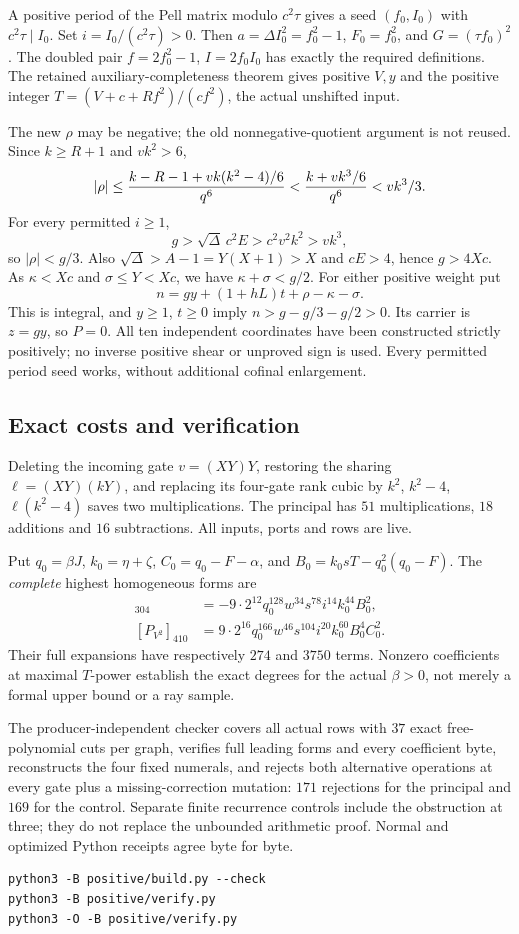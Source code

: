 A positive period of the Pell matrix modulo \(c^2\tau\) gives a seed
\((f_0,I_0)\) with \(c^2\tau\mid I_0\).
Set \(i=I_0/(c^2\tau)>0\).  Then \(a=\Delta I_0^2=f_0^2-1\),
\(F_0=f_0^2\), and \(G=(\tau f_0)^2\).
The doubled pair \(f=2f_0^2-1\), \(I=2f_0I_0\) has exactly the
required definitions.  The retained auxiliary-completeness theorem gives
positive \(V,y\) and the positive integer
\(T=(V+c+Rf^2)/(cf^2)\), the actual unshifted input.

The new \(\rho\) may be negative; the old nonnegative-quotient argument
is not reused.  Since \(k\ge R+1\) and \(vk^2>6\),
\[
 |\rho|\le {k-R-1+vk(k^2-4)/6\over q^6}
       <{k+vk^3/6\over q^6}<vk^3/3.
\]
For every permitted \(i\ge1\),
\[
 g>\sqrt\Delta\,c^2E>c^2v^2k^2>vk^3,
\]
so \(|\rho|<g/3\).  Also \(\sqrt\Delta>A-1=Y(X+1)>X\) and
\(cE>4\), hence \(g>4Xc\).  As \(\kappa<Xc\) and
\(\sigma\le Y<Xc\), we have \(\kappa+\sigma<g/2\).
For either positive weight put
\[
 n=gy+(1+hL)t+\rho-\kappa-\sigma.
\]
This is integral, and \(y\ge1\), \(t\ge0\) imply
\(n>g-g/3-g/2>0\).  Its carrier is \(z=gy\), so \(P=0\).
All ten independent coordinates have been constructed strictly positively;
no inverse positive shear or unproved sign is used.  Every permitted
period seed works, without additional cofinal enlargement.

\subsection{Exact costs and verification}
Deleting the incoming gate \(v=(XY)Y\), restoring the sharing
\(\ell=(XY)(kY)\), and replacing its four-gate rank cubic by
\(k^2\), \(k^2-4\), \(\ell(k^2-4)\) saves two multiplications.
The principal has \(51\) multiplications, \(18\) additions and
\(16\) subtractions.  All inputs, ports and rows are live.

Put \(q_0=\beta J\), \(k_0=\eta+\zeta\),
\(C_0=q_0-F-\alpha\), and
\(B_0=k_0sT-q_0^2(q_0-F)\).  The \emph{complete} highest homogeneous
forms are
\begin{align*}
 [P_{bV}]_{304}
 &=-9\cdot2^{12}q_0^{128}w^{34}s^{78}i^{14}k_0^{44}B_0^2,\\
 [P_{V^2}]_{410}
 &=9\cdot2^{16}q_0^{166}w^{46}s^{104}i^{20}k_0^{60}B_0^4C_0^2.
\end{align*}
Their full expansions have respectively \(274\) and \(3750\) terms.
Nonzero coefficients at maximal \(T\)-power establish the exact degrees
for the actual \(\beta>0\), not merely a formal upper bound or a ray sample.

The producer-independent checker covers all actual rows with \(37\)
exact free-polynomial cuts per graph, verifies full leading forms and
every coefficient byte, reconstructs the four fixed numerals, and rejects
both alternative operations at every gate plus a missing-correction
mutation: \(171\) rejections for the principal and \(169\) for the control.
Separate finite recurrence controls include the obstruction at three;
they do not replace the unbounded arithmetic proof.
Normal and optimized Python receipts agree byte for byte.
\begin{verbatim}
python3 -B positive/build.py --check
python3 -B positive/verify.py
python3 -O -B positive/verify.py
\end{verbatim}

